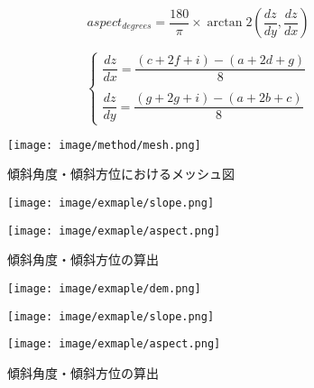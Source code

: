       \begin{equation}
        \label{傾斜方位}
        aspect_{degrees} = 
        \dfrac{180} {\pi} \times
        \arctan 2 (\dfrac{dz}{dy}, \dfrac{dz}{dx})
      \end{equation}

      \begin{equation}
        \label{X方向・Y方向の変化率}
        \left\{
          \begin{array}{l}
            \dfrac{dz}{dx} = 
              \dfrac {(c + 2f + i) - (a + 2d + g)} {8} \\ \\
            \dfrac{dz}{dy} = 
              \dfrac {(g + 2g + i) - (a + 2b + c)} {8}    
          \end{array}
        \right.
      \end{equation}

      \begin{figure}[t]
        \centering
        \texttt{[image: image/method/mesh.png]}
        \caption{傾斜角度・傾斜方位におけるメッシュ図}
        \label{メッシュ図}
      \end{figure}
      
      \begin{figure}[t]
        \begin{minipage}[c]{0.45\hsize}
          \centering
          \texttt{[image: image/exmaple/slope.png]}
        \end{minipage}
        \begin{minipage}[c]{0.45\hsize}
          \centering
          \texttt{[image: image/exmaple/aspect.png]}
        \end{minipage}
        \caption{傾斜角度・傾斜方位の算出}
        \label{傾斜角度・傾斜方位図}
      \end{figure}

      \begin{figure}[t]
        \begin{minipage}[c]{0.329\hsize}
          \centering
          \texttt{[image: image/exmaple/dem.png]}
          \label{入力DEM}
        \end{minipage}
        \begin{minipage}[c]{0.329\hsize}
          \centering
          \texttt{[image: image/exmaple/slope.png]}
          \label{傾斜角度図}
        \end{minipage}
        \begin{minipage}[c]{0.329\hsize}
          \centering
          \texttt{[image: image/exmaple/aspect.png]}
          \label{傾斜方位図}
        \end{minipage}
        \caption{傾斜角度・傾斜方位の算出}
      \end{figure}



